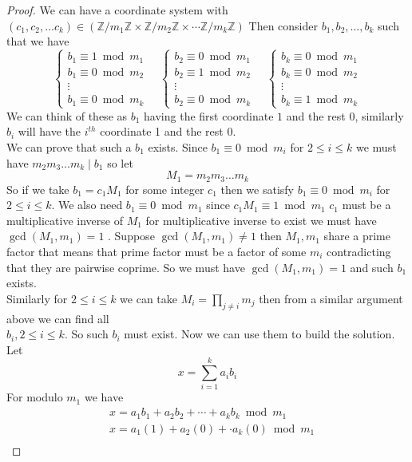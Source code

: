 \documentclass[16pt,a4paper]{article}
\theoremstyle{definition}
\newcommand{\Z}{\mathbb{Z}}
\begin{document}
\begin{proof}
We can have a coordinate system with $(c_1,c_2,\ldots c_k)\in (\Z/m_1\Z\times \Z/m_2\Z\times \cdots \Z/m_k\Z)$ Then consider $b_1, b_2,\ldots, b_k$ such that we have 
\[
\begin{cases}
b_1 \equiv 1 \bmod m_1 \\
b_1 \equiv 0 \bmod m_2 \\
\vdots \\
b_1 \equiv 0 \bmod m_k 
\end{cases}
\quad 
\begin{cases}
b_2 \equiv 0 \bmod m_1 \\
b_2 \equiv 1 \bmod m_2 \\
\vdots \\
b_2 \equiv 0 \bmod m_k 
\end{cases}
\quad
\begin{cases}
b_k \equiv 0 \bmod m_1 \\
b_k \equiv 0 \bmod m_2 \\
\vdots \\
b_k \equiv 1 \bmod m_k 
\end{cases}
\]
We can think of these as $b_1$ having the first coordinate $1$ and the rest 0, similarly $b_i$ will have the $i^{th}$ coordinate 1 and the rest 0. 
\\
We can prove that such a $b_1$ exists. Since $b_1 \equiv 0 \bmod m_i$ for $2\leq i \leq k$ we must have $m_2m_3\ldots m_k \mid b_1$ so let 
\[M_1 = m_2m_3\ldots m_k\]
So if we take $b_1 = c_1M_1$ for some integer $c_1$ then we satisfy $b_1 \equiv 0 \bmod m_i$ for $2\leq i \leq k$. We also need $b_1 \equiv 0 \bmod m_1$ since $c_1M_1 \equiv 1\bmod m_1$ $c_1$ must be a multiplicative inverse of $M_1$ for multiplicative inverse to exist we must have $\gcd(M_1,m_1)=1 $ . Suppose $\gcd(M_1,m_1)\neq 1$ then $M_1,m_1$ share a prime factor that means that prime factor must be a factor of some $m_i$ contradicting that they are pairwise coprime. So we must have $\gcd(M_1,m_1) = 1$ and such $b_1$ exists. 
\\
Similarly for $2\leq i\leq k$ we can take $M_i = \prod\limits_{j\neq i} m_j$ then from a similar argument above we can find all \\
$b_i, 2\leq i \leq k$. So such $b_i$ must exist. Now we can use them to build the solution. 
\newpage
Let 
\[
x=\sum_{i=1}^k a_ib_i
\]
For modulo $m_1$ we have 
\begin{align*}
&x = a_1b_1 + a_2b_2 + \cdots + a_kb_k \bmod m_1 \\
&x = a_1(1) + a_2(0) + \cdot a_k(0) \bmod m_1 \\

\end{align*}
\end{proof}
\end{document}
